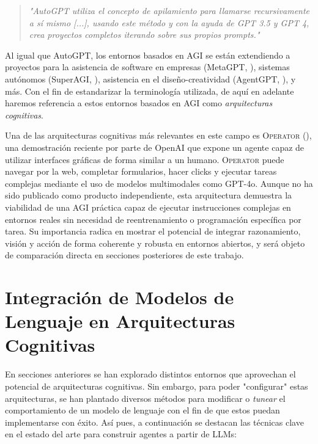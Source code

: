 \begin{quote} \small\textit{
    "AutoGPT utiliza el concepto de apilamiento para llamarse recursivamente a
    sí mismo [...], usando este método y con la ayuda de GPT 3.5 y GPT 4, crea
    proyectos completos iterando sobre sus propios prompts." 
\citet{fezari2023gpt} } \end{quote}

Al igual que AutoGPT, los entornos basados en AGI se están extendiendo a proyectos
para la asistencia de software en empresas (MetaGPT,
\cite{alexander2023metagpt}), sistemas autónomos (SuperAGI,
\cite{transformer2023superagi}), asistencia en el diseño-creatividad (AgentGPT,
\cite{reworkd2023agentgpt}), y más. Con el fin de estandarizar la terminología utilizada,
de aquí en adelante haremos referencia a estos entornos basados en AGI como 
\emph{arquitecturas cognitivas}.

Una de las arquitecturas cognitivas más relevantes en este campo es \textsc{Operator} (\cite{openai_operator_2025}), 
una demostración reciente por parte de OpenAI que expone un agente capaz de utilizar
interfaces gráficas de forma similar a un humano. \textsc{Operator} puede
navegar por la web, completar formularios, hacer clicks y ejecutar tareas
complejas mediante el uso de modelos multimodales como GPT-4o. Aunque no ha sido
publicado como producto independiente, esta arquitectura demuestra la viabilidad
de una AGI práctica capaz de ejecutar instrucciones complejas en entornos reales
sin necesidad de reentrenamiento o programación específica por tarea. 
Su importancia radica en mostrar el potencial de integrar razonamiento, 
visión y acción de forma coherente y robusta en entornos abiertos, y 
será objeto de comparación directa en secciones posteriores de este trabajo.

\section{Integración de Modelos de Lenguaje en Arquitecturas Cognitivas}

En secciones anteriores se han explorado distintos entornos que aprovechan el 
potencial de arquitecturas cognitivas. Sin embargo, para poder "configurar" estas
arquitecturas, se han plantado diversos métodos para modificar o \emph{tunear}
el comportamiento de un modelo de lenguaje con el fin de que estos puedan implementarse 
con éxito. Así pues, a continuación se destacan las técnicas clave en el estado del arte para
construir agentes a partir de LLMs:

